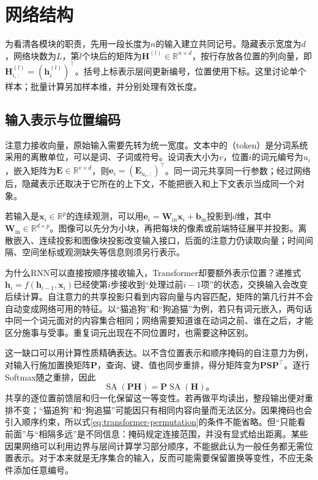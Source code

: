 \section{网络结构}
\label{sec:transformer-structure}

为看清各模块的职责，先用一段长度为$n$的输入建立共同记号。隐藏表示宽度为$d$，网络块数为$L$，第$l$个块后的矩阵为$\bm H^{(l)}\in\mathbb R^{n\times d}$，按行存放各位置的列向量，即$\bm H_{i,:}^{(l)}=(\bm h_i^{(l)})^{\top}$。括号上标表示层间更新编号，位置使用下标。这里讨论单个样本；批量计算另加样本维，并分别处理有效长度。

\subsection{输入表示与位置编码}
\label{sec:transformer-input}

注意力接收向量，原始输入需要先转为统一宽度。文本中的（token）是分词系统采用的离散单位，可以是词、子词或符号。设词表大小为$v$，位置$i$的词元编号为$u_i$，嵌入矩阵为$\bm E\in\mathbb R^{v\times d}$，则$\bm e_i=(\bm E_{u_i,:})^{\top}$。同一词元共享同一行参数；经过网络后，隐藏表示还取决于它所在的上下文，不能把嵌入和上下文表示当成同一个对象。

若输入是$\bm x_i\in\mathbb R^p$的连续观测，可以用$\bm e_i=\bm W_{\mathrm{in}}\bm x_i+\bm b_{\mathrm{in}}$投影到$d$维，其中$\bm W_{\mathrm{in}}\in\mathbb R^{d\times p}$。图像可以先分为小块，再把每块的像素或前端特征展平并投影。离散嵌入、连续投影和图像块投影改变输入接口，后面的注意力仍读取向量；时间间隔、空间坐标或观测缺失等信息则须另行表示。

为什么RNN可以直接按顺序接收输入，Transformer却要额外表示位置？递推式$\bm h_i=f(\bm h_{i-1},\bm x_i)$已经使第$i$步接收到“处理过前$i-1$项”的状态，交换输入会改变后续计算。自注意力的共享投影只看到内容向量与内容匹配，矩阵的第几行并不会自动变成网络可用的特征。以“猫追狗”和“狗追猫”为例，若只有词元嵌入，两句话中同一个词元面对的内容集合相同；网络需要知道谁在动词之前、谁在之后，才能区分施事与受事。重复词元出现在不同位置时，也需要这种区别。

这一缺口可以用计算性质精确表达。以不含位置表示和顺序掩码的自注意力为例，对输入行施加置换矩阵$\bm P$，查询、键、值也同步重排，得分矩阵变为$\bm P\bm S\bm P^{\top}$。逐行Softmax随之重排，因此
\begin{equation}
  \operatorname{SA}(\bm P\bm H)
  =\bm P\operatorname{SA}(\bm H)\text{。}
  \label{eq:transformer-permutation}
\end{equation}
共享的逐位置前馈层和归一化保留这一等变性。若再做平均读出，整段输出便对重排不变；“猫追狗”和“狗追猫”可能因只有相同内容向量而无法区分。因果掩码也会引入顺序约束，所以式\eqref{eq:transformer-permutation}的条件不能省略。但“只能看前面”与“相隔多远”是不同信息：掩码规定连接范围，并没有显式给出距离。某些因果网络可以利用边界与层间计算学习部分顺序，不能据此认为一般任务都无需位置表示。对于本来就是无序集合的输入，反而可能需要保留置换等变性，不应无条件添加任意编号。

